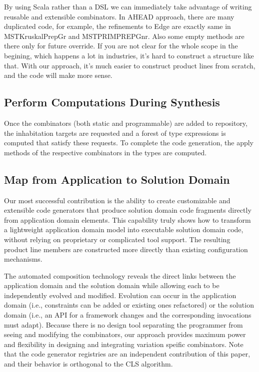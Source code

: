 By using Scala rather than a DSL we can immediately take advantage of writing reusable and extensible combinators.
In AHEAD approach, there are many duplicated code, for example, the refinements to Edge are exactly same in MSTKruskalPrepGr
 and MSTPRIMPREPGnr. Also some empty methods are there only for future override. If you are not clear for the whole
 scope in the begining, which happens a lot in industries, it's hard to construct a structure like that. With our
 approach, it's much easier to construct product lines from scratch, and the code will make more sense.


 \subsection{Perform Computations During Synthesis}

Once the combinators (both static and programmable) are added to repository, the inhabitation targets are requested
and a forest of type expressions is computed that satisfy these requests. To complete the code generation, the apply
methods of the respective combinators in the types are computed.


 \subsection{Map from Application to Solution Domain}

 Our most successful contribution is the ability to create customizable and extensible code generators that produce
 solution domain code fragments directly from application domain elements.
 This capability truly shows how to transform a lightweight application domain model into executable solution domain
 code, without relying on proprietary or complicated tool support. The resulting product line members are constructed
 more directly than existing configuration mechanisms.

 The automated composition technology reveals the direct links between the application domain and the solution
 domain while allowing each to be independently evolved and modified. Evolution can occur in the application domain
 (i.e., constraints can be added or existing ones refactored) or the solution domain (i.e., an API for a framework
 changes and the corresponding invocations must adapt). Because there is no design tool separating the programmer
 from seeing and modifying the combinators, our approach provides maximum power and flexibility in designing and
 integrating variation speific combinators. Note that the code generator registries are an independent contribution
 of this paper, and their behavior is orthogonal to the CLS algorithm.

